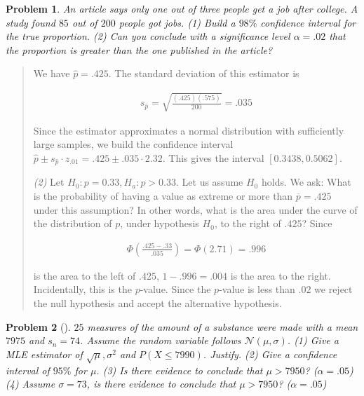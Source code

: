 \documentclass[a4paper, 12pt]{article}
\newtheorem{problem}{Problem}
\newtheorem{problem}{Problem}
\begin{document}
\pagebreak 

\begin{problem}
    An article says only one out of three people get a job after college. A
    study found $85$ out of $200$ people got jobs. \textit{(1)} Build a $98\%$
    confidence interval for the true proportion. \textit{(2)} Can you conclude
    with a significance level $\alpha = .02$ that the proportion is
    \textit{greater} than the one published in the article?
\end{problem}


\small
\begin{quote}

We have $\hat{p} = .425$. The standard deviation of this estimator is 

\begin{align*}
    s_{\hat{p}} = \sqrt{ \frac{(.425)(.575)}{200} }  = .035
\end{align*}

Since the estimator approximates a normal distribution with sufficiently large
samples, we build the confidence interval $\hat{p} \pm
s_{\hat{p}} \cdot z_{.01} = .425 \pm .035 \cdot 2.32$. This gives the
interval $\left[ 0.3438, 0.5062 \right] $.

\textit{(2)} Let $H_0 :p = 0.33, H_a : p > 0.33$. Let us assume $H_0$ holds. We
ask: What is the probability of having a value as extreme or more than $\overline{p} = .425$ under
this assumption? In other words, what is the area under the curve of the
distribution of $p$, under hypothesis $H_0$, to the right of $.425$? Since

\begin{align*}
    \Phi( \frac{.425 - .33}{.035} ) = \Phi(2.71) = .996
\end{align*}

is the area to the left of $.425$, $1 - .996 = .004$ is the area to the right.
Incidentally, this is the $p$-value. Since the $p$-value is less than $.02$ we
reject the null hypothesis and accept the alternative hypothesis.

\end{quote}
\normalsize

\pagebreak 

\begin{problem}[]
    $25$ measures of the amount of a substance were made with a mean $7975$ and
    $s_n = 74$. Assume the random variable follows $\mathcal{N}(\mu, \sigma)$.
    \textit{(1)} Give a MLE estimator of $\sqrt{\mu}, \sigma^2 $ and $P(X \leq
    7990)$. Justify. \textit{(2)} Give a confidence interval of $95\%$ for
    $\mu$. \textit{(3)} Is there evidence to conclude that $\mu > 7950$?
    ($\alpha = .05$)
    \textit{(4)} Assume $\sigma = 73$, is there evidence to conclude that $\mu >
    7950$? ($\alpha = .05$)
\end{problem}
\end{document}
